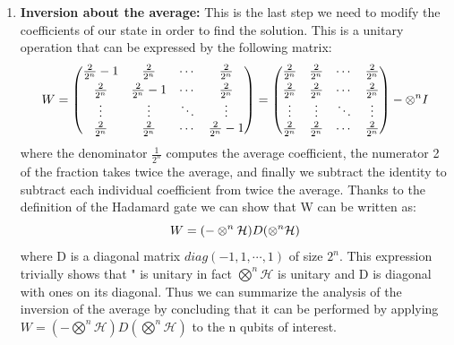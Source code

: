 \documentclass[english]{article}
\begin{document}
\begin{enumerate}
					\item \textbf{Inversion about the average:}
					This is the last step we need to modify the coefficients of our state in order to find the solution. This is a unitary operation that can be expressed by the following matrix:
					\begin{equation*}
						\centering
						W =
						\begin{pmatrix}
						\frac{2}{2^n}-1 & \frac{2}{2^n} & \cdots & \frac{2}{2^n} \vspace{3pt} \\
						\frac{2}{2^n} & \frac{2}{2^n}-1 & \cdots & \frac{2}{2^n} \\
						\vdots & \vdots & \ddots & \vdots \\
						\frac{2}{2^n} & \frac{2}{2^n} & \cdots & \frac{2}{2^n}-1
						\end{pmatrix}
						=
						\begin{pmatrix}
						\frac{2}{2^n} & \frac{2}{2^n} & \cdots & \frac{2}{2^n} \vspace{3pt} \\
						\frac{2}{2^n} & \frac{2}{2^n} & \cdots & \frac{2}{2^n} \\
						\vdots & \vdots & \ddots & \vdots \\
						\frac{2}{2^n} & \frac{2}{2^n} & \cdots & \frac{2}{2^n}
						\end{pmatrix}
						- \otimes^{n}I
					\end{equation*}
					where the denominator $\frac{1}{2^n}$ computes the average coefficient, the numerator 2 of the fraction takes twice the average, and finally we subtract the identity to subtract each individual coefficient from twice the average. Thanks to the definition of the Hadamard gate we can show that W can be written as:
					\begin{equation*}
					\centering
					W = (-\otimes^n\mathcal{H})D(\otimes^n\mathcal{H})
					\end{equation*}
					where D is a diagonal matrix $diag(-1,1,\cdots,1)$ of size $2^n$. This expression trivially shows that " is unitary in fact $\bigotimes^n\mathcal{H}$ is unitary and D is diagonal with ones on its diagonal. Thus we can summarize the analysis of the inversion of the average by concluding that it can be performed by applying $W = (-\bigotimes^n\mathcal{H})D(\bigotimes^n\mathcal{H})$ to the n qubits of interest.
				\end{enumerate} 
	
	\newpage
\end{document}
